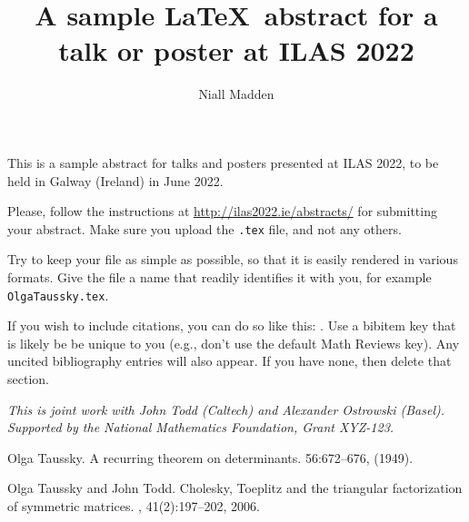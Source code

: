 \documentclass[a4paper]{amsart}
\date{}
\begin{document}
\title{A sample \LaTeX\ abstract for a talk or poster at ILAS 2022}
\author{Niall Madden} %
\address{University of Wherever} %

\maketitle


This is a sample abstract for talks and posters
presented at ILAS 2022, to be held
in Galway (Ireland) in June 2022. 

Please, follow the instructions at \url{http://ilas2022.ie/abstracts/}
for submitting your abstract. Make sure you upload the \texttt{.tex}
file, and not any others. 

Try to keep your file as simple as possible, so that it is easily
rendered in various formats. Give the file a name that readily
identifies it with you, for example \texttt{OlgaTaussky.tex}. 

If you wish to include citations, you can do so like this:
\cite{my_key_for_OT49}. Use a bibitem key that is likely be be unique to
you (e.g., don't use the default Math Reviews key).
Any uncited bibliography entries will also
appear. If you have none, then delete that section.

\emph{This is joint work with John Todd (Caltech) and Alexander Ostrowski (Basel).
Supported by the National Mathematics Foundation, Grant XYZ-123.}

\begin{thebibliography}{1}
Olga Taussky.
\newblock A recurring theorem on determinants.
  56:672–676,  (1949).

Olga Taussky and John Todd.
\newblock Cholesky, Toeplitz and the triangular factorization of
symmetric matrices.
, 41(2):197--202, 2006.
\end{thebibliography}
\end{document}
